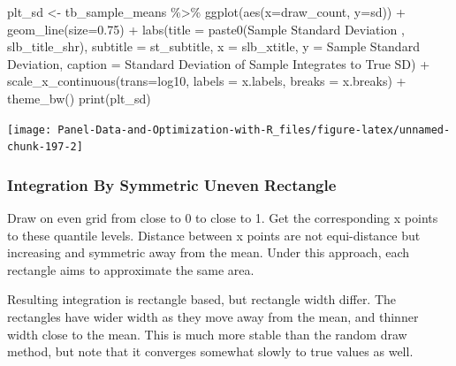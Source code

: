 \documentclass[
]{book}
\newenvironment{Shaded}{\begin{snugshade}}{\end{snugshade}}
\newcommand{\AttributeTok}[1]{\textcolor[rgb]{0.77,0.63,0.00}{#1}}
\newcommand{\FloatTok}[1]{\textcolor[rgb]{0.00,0.00,0.81}{#1}}
\newcommand{\FunctionTok}[1]{\textcolor[rgb]{0.00,0.00,0.00}{#1}}
\newcommand{\NormalTok}[1]{#1}
\newcommand{\OtherTok}[1]{\textcolor[rgb]{0.56,0.35,0.01}{#1}}
\newcommand{\SpecialCharTok}[1]{\textcolor[rgb]{0.00,0.00,0.00}{#1}}
\newcommand{\StringTok}[1]{\textcolor[rgb]{0.31,0.60,0.02}{#1}}
\begin{document}
\begin{Shaded}
\begin{Highlighting}[]
\NormalTok{plt\_sd }\OtherTok{\textless{}{-}}\NormalTok{ tb\_sample\_means }\SpecialCharTok{\%\textgreater{}\%}
  \FunctionTok{ggplot}\NormalTok{(}\FunctionTok{aes}\NormalTok{(}\AttributeTok{x=}\NormalTok{draw\_count, }\AttributeTok{y=}\NormalTok{sd)) }\SpecialCharTok{+}
  \FunctionTok{geom\_line}\NormalTok{(}\AttributeTok{size=}\FloatTok{0.75}\NormalTok{) }\SpecialCharTok{+}
  \FunctionTok{labs}\NormalTok{(}\AttributeTok{title =} \FunctionTok{paste0}\NormalTok{(}\StringTok{\textquotesingle{}Sample Standard Deviation \textquotesingle{}}\NormalTok{, slb\_title\_shr),}
       \AttributeTok{subtitle =}\NormalTok{ st\_subtitle,}
       \AttributeTok{x =}\NormalTok{ slb\_xtitle,}
       \AttributeTok{y =} \StringTok{\textquotesingle{}Sample Standard Deviation\textquotesingle{}}\NormalTok{,}
       \AttributeTok{caption =} \StringTok{\textquotesingle{}Standard Deviation of Sample Integrates to True SD\textquotesingle{}}\NormalTok{) }\SpecialCharTok{+}
  \FunctionTok{scale\_x\_continuous}\NormalTok{(}\AttributeTok{trans=}\StringTok{\textquotesingle{}log10\textquotesingle{}}\NormalTok{, }\AttributeTok{labels =}\NormalTok{ x.labels, }\AttributeTok{breaks =}\NormalTok{ x.breaks) }\SpecialCharTok{+}
  \FunctionTok{theme\_bw}\NormalTok{()}
\FunctionTok{print}\NormalTok{(plt\_sd)}
\end{Highlighting}
\end{Shaded}

\begin{center}\texttt{[image: Panel-Data-and-Optimization-with-R\_files/figure-latex/unnamed-chunk-197-2]} \end{center}

\hypertarget{integration-by-symmetric-uneven-rectangle}{%
\subsubsection{Integration By Symmetric Uneven Rectangle}\label{integration-by-symmetric-uneven-rectangle}}

Draw on even grid from close to 0 to close to 1. Get the corresponding x points to these quantile levels. Distance between x points are not equi-distance but increasing and symmetric away from the mean. Under this approach, each rectangle aims to approximate the same area.

Resulting integration is rectangle based, but rectangle width differ. The rectangles have wider width as they move away from the mean, and thinner width close to the mean. This is much more stable than the random draw method, but note that it converges somewhat slowly to true values as well.
\end{document}
